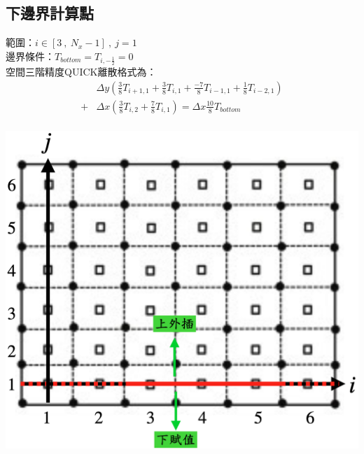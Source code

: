 \documentclass[12pt]{article}
\begin{document}
\subsection{下邊界計算點}
 \begin{minipage}{0.6\textwidth}
   \noindent 範圍：$i\in[3\ ,\ N_{x}-1]\ ,\ j=1$\\[1.5ex]
   \noindent 邊界條件：$T_{bottom} = T_{i,-\frac{1}{2}}= 0$\\[1.5ex]
   \noindent 空間三階精度QUICK離散格式為：
   \begin{equation*}\label{eq:QUICK3}\begin{split}
      &\Delta y (\frac{3}{8}T_{i+1,1} + \frac{3}{8}T_{i,1} +  \frac{-7}{8}T_{i-1,1}+ \frac{1}{8}T_{i-2,1}) \\[1.5ex]
    + &\Delta x (\frac{3}{8}T_{i,2} + \frac{7}{8}T_{i,1} ) =\Delta x\frac{10}{8}T_{bottom} \\[1.5ex]
   \end{split}\end{equation*}
   \end{minipage}%
   \hfill
   \begin{minipage}{0.34\textwidth}
   \centering
   \includegraphics[width=\linewidth,height=9\baselineskip]{16.png}
   \label{fig:3boundary}
\end{minipage}
\end{document}
